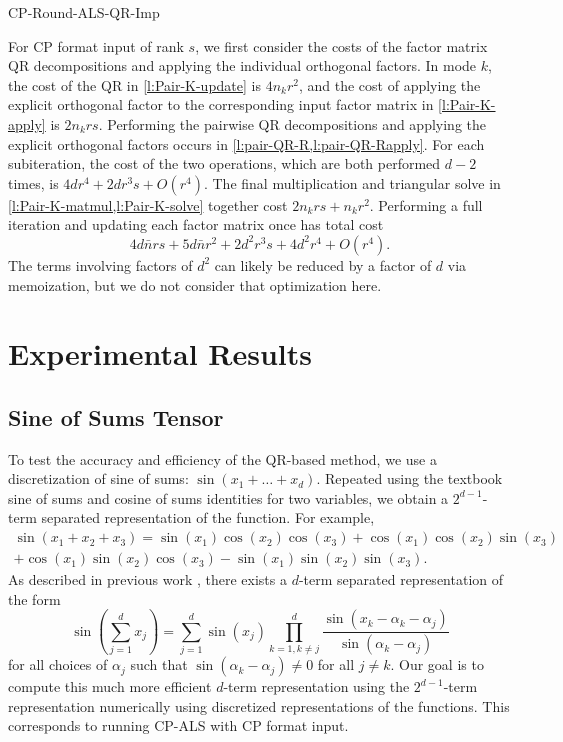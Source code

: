 \documentclass{article}
\begin{document}
\begin{algorithm}
  \caption{CP-Round-ALS-QR-Imp}
  \label{alg:cp-als-pairwise-qr-kruskal}
  
\end{algorithm}


For CP format input of rank $s$, we first consider the costs of the factor matrix QR decompositions and applying the individual orthogonal factors.
In mode $k$, the cost of the QR in \cref{l:Pair-K-update} is $4n_kr^2$, and the cost of applying the explicit orthogonal factor to the corresponding input factor matrix in \cref{l:Pair-K-apply} is $2n_krs$.
Performing the pairwise QR decompositions and applying the explicit orthogonal factors occurs in \cref{l:pair-QR-R,l:pair-QR-Rapply}.
For each subiteration, the cost of the two operations, which are both performed $d-2$ times, is $4dr^4+2dr^3s+O(r^4)$.
The final multiplication and triangular solve in \cref{l:Pair-K-matmul,l:Pair-K-solve} together cost $2n_krs+n_kr^2$.
Performing a full iteration and updating each factor matrix once has total cost
$$ 4d\bar{n}rs + 5d\bar{n}r^2 + 2d^2r^3s + 4d^2r^4 + O(r^4). $$
The terms involving factors of $d^2$ can likely be reduced by a factor of $d$ via memoization, but we do not consider that optimization here.

\section{Experimental Results} 
\label{sec:result}


\subsection{Sine of Sums Tensor}

To test the accuracy and efficiency of the QR-based method, we use a discretization of sine of sums: $\sin(x_1+\dots+ x_d)$.
Repeated using the textbook sine of sums and cosine of sums identities for two variables, we obtain a $2^{d-1}$-term separated representation of the function.
For example, 
\begin{equation*}
\begin{split}
\sin(x_1+x_2+x_3) = \sin(x_1)\cos(x_2)\cos(x_3)+\cos(x_1)\cos(x_2)\sin(x_3) \\
+\cos(x_1)\sin(x_2)\cos(x_3) - \sin(x_1)\sin(x_2)\sin(x_3).
\end{split}
\end{equation*}
As described in previous work \cite{BM02,MVLB23}, there exists a $d$-term separated representation of the form
\begin{equation}
\label{eq:dtermrep}
\sin\left(\sum^d_{j=1}x_j\right) = \sum^d_{j=1}\sin(x_j)\prod^d_{k=1,k\neq j}\frac{\sin(x_k - \alpha_k -\alpha_j)}{\sin(\alpha_k - \alpha_j)}
\end{equation}
for all choices of  ${\alpha_j}$ such that $\sin(\alpha_k - \alpha_j) \neq 0$ for all $j \neq k$.
Our goal is to compute this much more efficient $d$-term representation using the $2^{d-1}$-term representation numerically using discretized representations of the functions.
This corresponds to running CP-ALS with CP format input.
\end{document}

